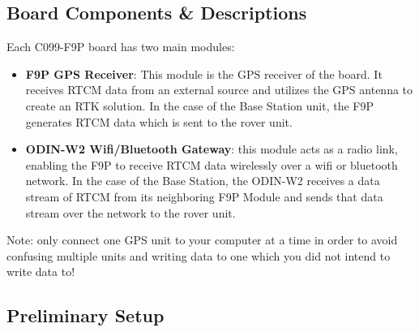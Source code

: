 \documentclass{article}%
\begin{document}
\subsection{Board Components \& Descriptions}
	Each C099-F9P board has two main modules:
	\begin{itemize}
		\item \textbf{F9P GPS Receiver}: This module is the GPS receiver of the board.  It receives RTCM data from an external source and utilizes the GPS antenna to create an RTK solution.  In the case of the Base Station unit, the F9P generates RTCM data which is sent to the rover unit.
		\item \textbf{ODIN-W2 Wifi/Bluetooth Gateway}: this module acts as a radio link, enabling the F9P to receive RTCM data wirelessly over a wifi or bluetooth network.  In the case of the Base Station, the ODIN-W2 receives a data stream of RTCM from its neighboring F9P Module and sends that data stream over the network to the rover unit.
	\end{itemize}

	\begin{myquote}
	Note: only connect one GPS unit to your computer at a time in order to avoid confusing multiple units and writing data to one which you did not intend to write data to!	
	\end{myquote}


\subsection{Preliminary Setup}\label{ref:down_config}
\end{document}

